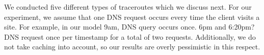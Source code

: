 




We conducted five different types of traceroutes which we discuss next.  For our experiment, 
we assume that one DNS request occurs every time the client visits a site. For example, 
in our model 9am, DNS query occurs once.  6pm and 6:20pm?  DNS request once per timestamp for a 
total of two requests.  
Additionally, we do not take caching into account, so our results are overly 
pessimistic in this respect.  

